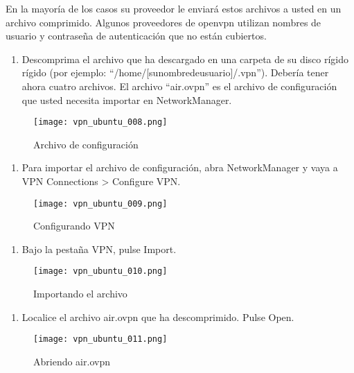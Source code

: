 \documentclass[10pt,a5paper,twoside,,]{book}
\providecommand{\tightlist}{%
  \setlength{\itemsep}{0pt}\setlength{\parskip}{0pt}}
\begin{document}
En la mayoría de los casos su proveedor le enviará estos archivos a
usted en un archivo comprimido. Algunos proveedores de openvpn utilizan
nombres de usuario y contraseña de autenticación que no están cubiertos.

\begin{enumerate}
\def\labelenumi{\arabic{enumi}.}
\tightlist
\item
  Descomprima el archivo que ha descargado en una carpeta de su disco
  rígido rígido (por ejemplo: ``/home/{[}sunombredeusuario{]}/.vpn'').
  Debería tener ahora cuatro archivos. El archivo ``air.ovpn'' es el
  archivo de configuración que usted necesita importar en
  NetworkManager.
\end{enumerate}

\begin{figure}[htbp]
\centering
\texttt{[image: vpn\_ubuntu\_008.png]}
\caption{Archivo de configuración}
\end{figure}

\begin{enumerate}
\def\labelenumi{\arabic{enumi}.}
\setcounter{enumi}{1}
\tightlist
\item
  Para importar el archivo de configuración, abra NetworkManager y vaya
  a VPN Connections \textgreater{} Configure VPN.
\end{enumerate}

\begin{figure}[htbp]
\centering
\texttt{[image: vpn\_ubuntu\_009.png]}
\caption{Configurando VPN}
\end{figure}

\begin{enumerate}
\def\labelenumi{\arabic{enumi}.}
\setcounter{enumi}{2}
\tightlist
\item
  Bajo la pestaña VPN, pulse Import.
\end{enumerate}

\begin{figure}[htbp]
\centering
\texttt{[image: vpn\_ubuntu\_010.png]}
\caption{Importando el archivo}
\end{figure}

\begin{enumerate}
\def\labelenumi{\arabic{enumi}.}
\setcounter{enumi}{3}
\tightlist
\item
  Localice el archivo air.ovpn que ha descomprimido. Pulse Open.
\end{enumerate}

\begin{figure}[htbp]
\centering
\texttt{[image: vpn\_ubuntu\_011.png]}
\caption{Abriendo air.ovpn}
\end{figure}
\end{document}
